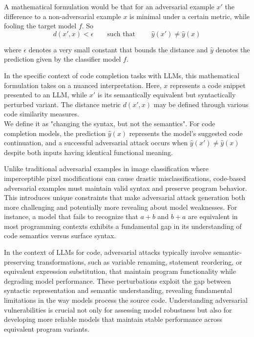 \documentclass[%
thesis=student,%
coverpage=false,%
titlepage=false,%
headmarks=true, %
english,%
font=libertine, %
math=newpxtx, %
BCOR=5mm,%
coverBCOR=11mm%
]{tum-templates/book/tumbook}
\begin{document}
A mathematical formulation would be that for an adversarial example $x'$ the difference to a non-adversarial example $x$ is minimal under a certain metric, while fooling the target model $f$. So
\begin{equation}
    d(x',x) < \epsilon  \qquad \text{such that } \qquad \hat{y}(x') \neq \hat{y}(x)
\end{equation}

where $\epsilon$ denotes a very small constant that bounds the distance and $\hat{y}$ denotes the prediction given by the classifier model $f$.

In the specific context of code completion tasks with LLMs, this mathematical formulation takes on a nuanced interpretation. Here, $x$ represents a code snippet presented to an LLM, while $x'$ is its semantically equivalent but syntactically perturbed variant. The distance metric $d(x',x)$ may be defined through various code similarity measures. \\
We define it as "changing the syntax, but not the semantics".
For code completion models, the prediction $\hat{y}(x)$ represents the model's suggested code continuation, and a successful adversarial attack occurs when $\hat{y}(x') \neq \hat{y}(x)$ despite both inputs having identical functional meaning.

Unlike traditional adversarial examples in image classification where imperceptible pixel modifications can cause drastic misclassifications, code-based adversarial examples must maintain valid syntax and preserve program behavior. This introduces unique constraints that make adversarial attack generation both more challenging and potentially more revealing about model weaknesses. For instance, a model that fails to recognize that $a + b$ and $b + a$ are equivalent in most programming contexts exhibits a fundamental gap in its understanding of code semantics versus surface syntax.

In the context of LLMs for code, adversarial attacks typically involve semantic-preserving transformations, such as variable renaming, statement reordering, or equivalent expression substitution, that maintain program functionality while degrading model performance.
These perturbations exploit the gap between syntactic representation and semantic understanding, revealing fundamental limitations in the way models process the source code. Understanding adversarial vulnerabilities is crucial not only for assessing model robustness but also for developing more reliable models that maintain stable performance across equivalent program variants.
\end{document}

